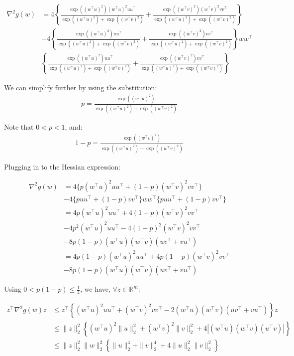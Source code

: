 \documentclass[11pt]{article}
\begin{document}
\begin{align*}
    \nabla^2 g(w) &= 
    4 \left\{ \frac{  \exp((w^{\top}u)^2)(w^{\top}u)^2 uu^{\top}  }{ \exp((w^{\top}u)^2) + \exp((w^{\top}v)^2)  } +
    \frac{  \exp((w^{\top}v)^2)(w^{\top}v)^2 vv^{\top}  }{ \exp((w^{\top}u)^2) + \exp((w^{\top}v)^2)  } \right\} \\
    &- 4 \left\{
    \frac{  \exp((w^{\top}u)^2) uu^{\top}  }{ \exp((w^{\top}u)^2) + \exp((w^{\top}v)^2)  } + \frac{  \exp((w^{\top}v)^2) vv^{\top}  }{ \exp((w^{\top}u)^2) + \exp((w^{\top}v)^2)  } \right\}
    ww^{\top} \\
     & \left\{ \frac{  \exp((w^{\top}u)^2) uu^{\top}  }{ \exp((w^{\top}u)^2) + \exp((w^{\top}v)^2)  } + \frac{  \exp((w^{\top}v)^2) vv^{\top}  }{ \exp((w^{\top}u)^2) + \exp((w^{\top}v)^2)  }
     \right\}
\end{align*}

We can simplify further by using the substitution: 
\begin{align*}
p = \frac{\exp((w^{\top}u)^2)}{ \exp((w^{\top}u)^2) + \exp((w^{\top}v)^2) }
\end{align*}

Note that $0 < p < 1$, and:
\begin{align*}
1 - p = \frac{\exp((w^{\top}v)^2)}{ \exp((w^{\top}u)^2) + \exp((w^{\top}v)^2) }
\end{align*}

Plugging in to the Hessian expression:

\begin{align*}
    \nabla^2 g(w) &= 
    4 \{ p(w^{\top}u)^2 uu^{\top} + (1-p)(w^{\top}v)^2 vv^{\top} \} \\
    &- 4 \{ p uu^{\top} + (1-p) vv^{\top} \}ww^{\top}\{ p uu^{\top} + (1-p) vv^{\top} \} \\
    &= 4 p(w^{\top}u)^2 uu^{\top} + 4 (1-p)(w^{\top}v)^2 vv^{\top} \\
    &- 4 p^2 (w^{\top}u)^2 uu^{\top} - 4 (1-p)^2 (w^{\top}v)^2 vv^{\top} \\
    &- 8 p (1-p) (w^{\top}u)(w^{\top}v)(uv^{\top} + vu^{\top}) \\
    &= 4 p (1 - p) (w^{\top}u)^2 uu^{\top} + 4 p (1-p) (w^{\top}v)^2 vv^{\top} \\
    &- 8 p (1-p) (w^{\top}u)(w^{\top}v)(uv^{\top} + vu^{\top})
\end{align*}

Using $0 < p(1-p) \leq \frac{1}{4}$, we have, $\forall z \in \mathbb{R}^m$:

\begin{align*}
    z^{\top} \nabla^2 g(w) z &\leq
    z^{\top} \left\{ (w^{\top}u)^2 uu^{\top} + (w^{\top}v)^2 vv^{\top} - 2 (w^{\top}u)(w^{\top}v)(uv^{\top} + vu^{\top}) \right\} z \\
    &\leq \|z\|_2^2 \left\{ (w^{\top}u)^2 \|u\|_2^2 + (w^{\top}v)^2 \|v\|_2^2 + 4 \left| (w^{\top}u)(w^{\top}v)(u^{\top}v) \right| \right\} \\
    &\leq \|z\|_2^2 \|w\|_2^2 \left\{ \|u\|_2^4 + \|v\|_2^4 + 4 \|u\|_2^2 \|v\|_2^2 \right\}
\end{align*}
\end{document}
